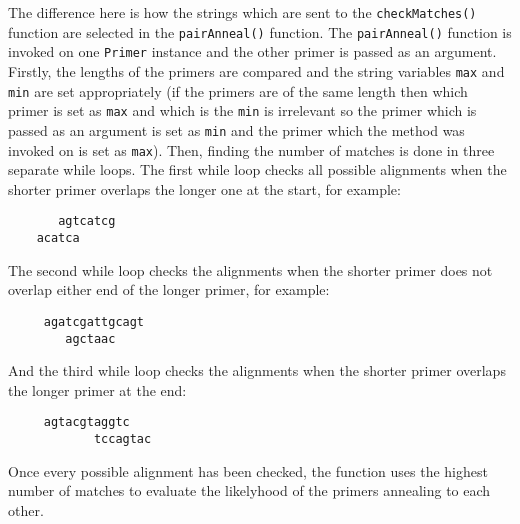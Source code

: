 The difference here is how the strings which are sent to the
\texttt{checkMatches()} function are selected in the
\texttt{pairAnneal()} function. The \texttt{pairAnneal()} function is
invoked on one \texttt{Primer} instance and the other primer is passed
as an argument. Firstly, the lengths of the primers are compared and the
string variables \texttt{max} and \texttt{min} are set appropriately (if
the primers are of the same length then which primer is set as
\texttt{max} and which is the \texttt{min} is irrelevant so the primer
which is passed as an argument is set as \texttt{min} and the primer
which the method was invoked on is set as \texttt{max}). Then, finding
the number of matches is done in three separate while loops. The first
while loop checks all possible alignments when the shorter primer
overlaps the longer one at the start, for example:
\begin{verbatim}
       agtcatcg
    acatca
\end{verbatim}
The second while loop checks the alignments when the shorter primer does
not overlap either end of the longer primer, for example:
\begin{verbatim}
     agatcgattgcagt
        agctaac
\end{verbatim}
And the third while loop checks the alignments when the shorter primer
overlaps the longer primer at the end:
\begin{verbatim}
     agtacgtaggtc
            tccagtac
\end{verbatim}
Once every possible alignment has been checked, the function uses the
highest number of matches to evaluate the likelyhood of the primers
annealing to each other.













